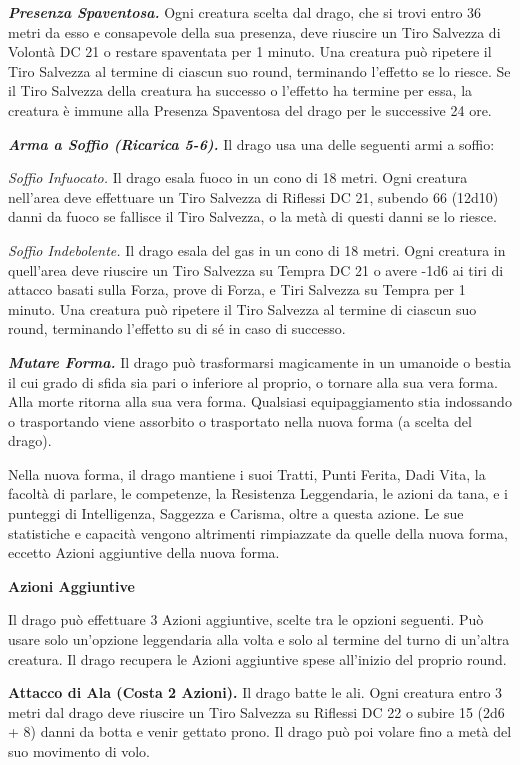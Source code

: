 \begin{multicols}{2}
\textit{\textbf{Presenza Spaventosa.}} Ogni creatura scelta dal drago, che si trovi entro 36 metri da esso e consapevole della sua presenza, deve riuscire un Tiro Salvezza di Volontà DC 21 o restare spaventata per 1 minuto. Una creatura può ripetere il Tiro Salvezza al termine di ciascun suo round, terminando l'effetto se lo riesce. Se il Tiro Salvezza della creatura ha successo o l'effetto ha termine per essa, la creatura è immune alla Presenza Spaventosa del drago per le successive 24 ore.

\textit{\textbf{Arma a Soffio (Ricarica 5-6).}} Il drago usa una delle seguenti armi a soffio:

\textit{Soffio Infuocato.} Il drago esala fuoco in un cono di 18 metri. Ogni creatura nell'area deve effettuare un Tiro Salvezza di Riflessi DC 21, subendo 66 (12d10) danni da fuoco se fallisce il Tiro Salvezza, o la metà di questi danni se lo riesce.

\textit{Soffio Indebolente.} Il drago esala del gas in un cono di 18 metri. Ogni creatura in quell'area deve riuscire un Tiro Salvezza su Tempra DC 21 o avere -1d6 ai tiri di attacco basati sulla Forza, prove di Forza, e Tiri Salvezza su Tempra per 1 minuto. Una creatura può ripetere il Tiro Salvezza al termine di ciascun suo round, terminando l'effetto su di sé in caso di successo.

\textit{\textbf{Mutare Forma.}} Il drago può trasformarsi magicamente in un umanoide o bestia il cui grado di sfida sia pari o inferiore al proprio, o tornare alla sua vera forma. Alla morte ritorna alla sua vera forma. Qualsiasi equipaggiamento stia indossando o trasportando viene assorbito o trasportato nella nuova forma (a scelta del drago).

Nella nuova forma, il drago mantiene i suoi Tratti, Punti Ferita, Dadi Vita, la facoltà di parlare, le competenze, la Resistenza Leggendaria, le azioni da tana, e i punteggi di Intelligenza, Saggezza e Carisma, oltre a questa azione. Le sue statistiche e capacità vengono altrimenti rimpiazzate da quelle della nuova forma, eccetto Azioni aggiuntive della nuova forma.

\textbf{Azioni Aggiuntive}

Il drago può effettuare 3 Azioni aggiuntive, scelte tra le opzioni seguenti. Può usare solo un'opzione leggendaria alla volta e solo al termine del turno di un'altra creatura. Il drago recupera le Azioni aggiuntive spese all'inizio del proprio round.

\textbf{Attacco di Ala (Costa 2 Azioni).} Il drago batte le ali. Ogni creatura entro 3 metri dal drago deve riuscire un Tiro Salvezza su Riflessi DC 22 o subire 15 (2d6 + 8) danni da botta e venir gettato prono. Il drago può poi volare fino a metà del suo movimento di volo.


\end{multicols}
